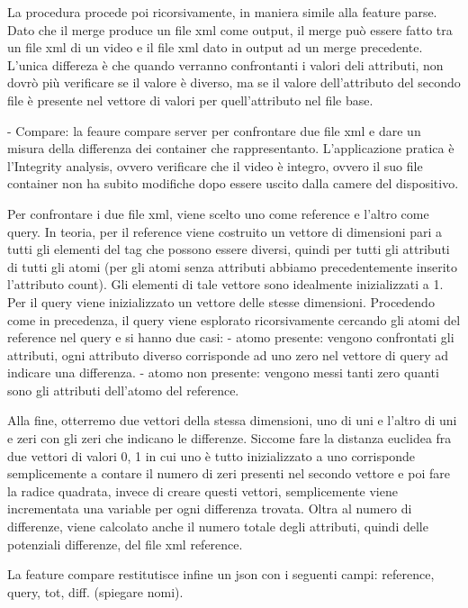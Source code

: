  La procedura procede poi ricorsivamente, in maniera simile alla feature parse.
 Dato che il merge produce un file xml come output, il merge può essere fatto tra un file xml di un video e il file xml dato in output ad un merge precedente. L'unica differeza è che quando verranno confrontanti i valori deli attributi, non dovrò più verificare se il valore è diverso, ma se il valore dell'attributo del secondo file è presente nel vettore di valori per quell'attributo nel file base.


- Compare:
 la feaure compare server per confrontare due file xml e dare un  misura della differenza dei container che rappresentanto. L'applicazione pratica è l'Integrity analysis, ovvero verificare che il video è integro, ovvero il suo file container non ha subito modifiche dopo essere uscito dalla camere del dispositivo.

 Per confrontare i due file xml, viene scelto uno come reference e l'altro come query. In teoria, per il reference viene costruito un vettore di dimensioni pari a tutti gli elementi del tag che possono essere diversi, quindi per tutti gli attributi di tutti gli atomi (per gli atomi senza attributi abbiamo precedentemente inserito l'attributo count). Gli elementi di tale vettore sono idealmente inizializzati a 1. Per il query viene inizializzato un vettore delle stesse dimensioni. Procedendo come in precedenza, il query viene esplorato ricorsivamente cercando gli atomi del reference nel query e si hanno due casi:
 - atomo presente: vengono confrontati gli attributi, ogni attributo diverso corrisponde ad uno zero nel vettore di query ad indicare una differenza.
 - atomo non presente: vengono messi tanti zero quanti sono gli attributi dell'atomo del reference.

 Alla fine, otterremo due vettori della stessa dimensioni, uno di uni e l'altro di uni e zeri con gli zeri che indicano le differenze.
 Siccome fare la distanza euclidea fra due vettori di valori {0, 1} in cui uno è tutto inizializzato a uno corrisponde semplicemente a contare il numero di zeri presenti nel secondo vettore e poi fare la radice quadrata, invece di creare questi vettori, semplicemente viene incrementata una variable per ogni differenza trovata.
 Oltra al numero di differenze, viene calcolato anche il numero totale degli attributi, quindi delle potenziali differenze, del file xml reference.

 La feature compare restitutisce infine un json con i seguenti campi: reference, query, tot, diff. (spiegare nomi).



